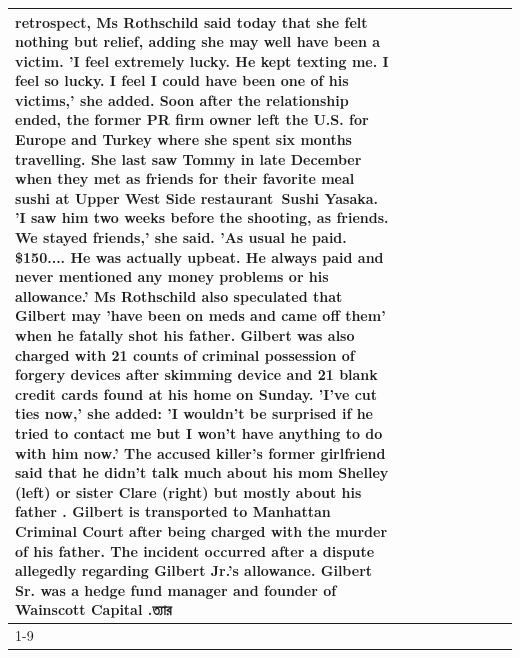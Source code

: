 \begin{table}[H]
\begin{tabular}{lllrlllll}
retrospect, Ms Rothschild said today that she felt nothing but relief, adding she may well have been a victim. 'I feel extremely lucky. He kept texting me. I feel so lucky. I feel I could have been one of his victims,' she added. Soon after the relationship ended, the former PR firm owner left the U.S. for Europe and Turkey where she spent six months  travelling. She last saw Tommy in late December when they met as friends for their favorite meal sushi at Upper West Side restaurant Sushi Yasaka. 'I saw him two weeks before the shooting, as friends. We stayed friends,' she said. 'As usual he paid. \$150.... He was actually upbeat. He always paid and never mentioned any money problems or his allowance.' Ms Rothschild also speculated that Gilbert may 'have been on meds and came off them' when he fatally shot his father. Gilbert was also charged with 21 counts of criminal possession of forgery devices after skimming device and 21 blank credit cards found at his home on Sunday. 'I've cut ties now,' she added: 'I wouldn’t be surprised if he tried to contact me but I won’t have anything to do with him now.' The accused killer's former girlfriend said that he didn't talk much about his mom Shelley (left) or sister Clare (right) but mostly about his father . Gilbert is transported to Manhattan Criminal Court  after being charged with the murder of his father. The incident occurred after a dispute allegedly regarding Gilbert Jr.'s allowance. Gilbert Sr. was a hedge fund manager and founder of Wainscott Capital .ত্যার \\
\cline{1-9}

\end{tabular}
\end{table}

